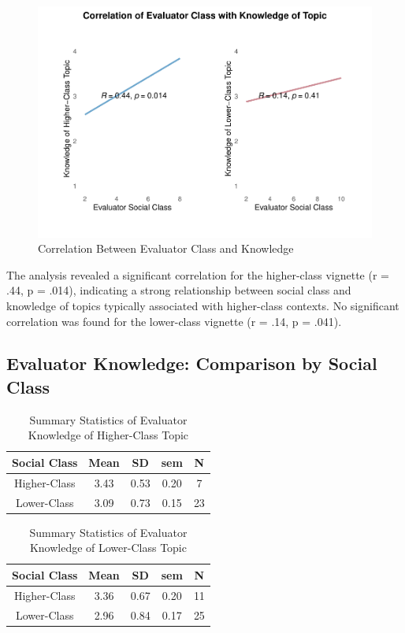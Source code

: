 \documentclass[
  man,floatsintext]{apa6}
\begin{document}
\begin{figure}
\centering
\includegraphics{sooyoun-pilot_files/figure-latex/correlation-analysis-1.pdf}
\caption{\label{fig:correlation-analysis}Correlation Between Evaluator Class and Knowledge}
\end{figure}

The analysis revealed a significant correlation for the higher-class vignette (r = .44, p = .014), indicating a strong relationship between social class and knowledge of topics typically associated with higher-class contexts. No significant correlation was found for the lower-class vignette (r = .14, p = .041).

\hypertarget{evaluator-knowledge-comparison-by-social-class}{%
\subsection{Evaluator Knowledge: Comparison by Social Class}\label{evaluator-knowledge-comparison-by-social-class}}

\begin{table}[!h]
\centering
\caption{\label{tab:group-statistics}Summary Statistics of Evaluator Knowledge of Higher-Class Topic}
\centering
\begin{tabular}[t]{ccccc}
\toprule
Social Class & Mean & SD & sem & N\\
\midrule
Higher-Class & 3.43 & 0.53 & 0.20 & 7\\
Lower-Class & 3.09 & 0.73 & 0.15 & 23\\
\bottomrule
\end{tabular}
\end{table}

\begin{table}[!h]
\centering
\caption{\label{tab:group-statistics}Summary Statistics of Evaluator Knowledge of Lower-Class Topic}
\centering
\begin{tabular}[t]{ccccc}
\toprule
Social Class & Mean & SD & sem & N\\
\midrule
Higher-Class & 3.36 & 0.67 & 0.20 & 11\\
Lower-Class & 2.96 & 0.84 & 0.17 & 25\\
\bottomrule
\end{tabular}
\end{table}
\end{document}
